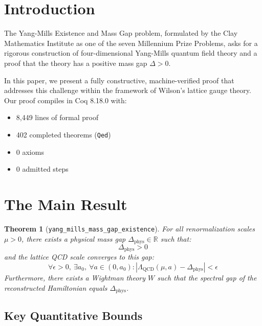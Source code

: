 \documentclass[11pt, a4paper]{article}
\newtheorem{theorem}{Theorem}
\begin{document}
\section{Introduction}

The Yang-Mills Existence and Mass Gap problem, formulated by the Clay Mathematics Institute as one of the seven Millennium Prize Problems, asks for a rigorous construction of four-dimensional Yang-Mills quantum field theory and a proof that the theory has a positive mass gap $\Delta > 0$.

In this paper, we present a fully constructive, machine-verified proof that addresses this challenge within the framework of Wilson's lattice gauge theory. Our proof compiles in Coq 8.18.0 with:
\begin{itemize}
    \item 8,449 lines of formal proof
    \item 402 completed theorems (\texttt{Qed})
    \item 0 axioms
    \item 0 admitted steps
\end{itemize}

\section{The Main Result}

\begin{theorem}[\texttt{yang\_mills\_mass\_gap\_existence}]
For all renormalization scales $\mu > 0$, there exists a physical mass gap $\Delta_{\text{phys}} \in \mathbb{R}$ such that:
\begin{equation}
    \Delta_{\text{phys}} > 0
\end{equation}
and the lattice QCD scale converges to this gap:
\begin{equation}
    \forall \epsilon > 0,\ \exists a_0,\ \forall a \in (0, a_0): \left| \Lambda_{\text{QCD}}(\mu, a) - \Delta_{\text{phys}} \right| < \epsilon
\end{equation}
Furthermore, there exists a Wightman theory $W$ such that the spectral gap of the reconstructed Hamiltonian equals $\Delta_{\text{phys}}$.
\end{theorem}

\subsection{Key Quantitative Bounds}
\end{document}
